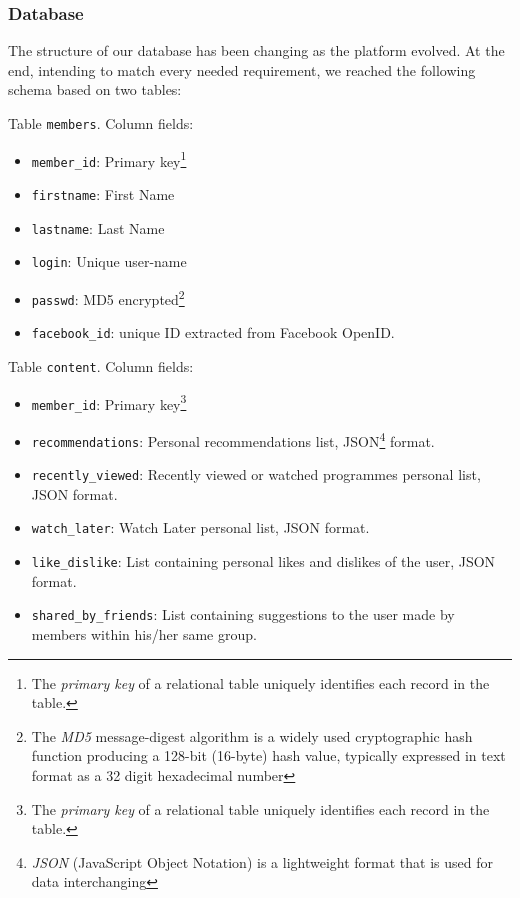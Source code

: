 \documentclass{acm_proc_article-sp}
\begin{document}
\subsubsection{Database}

The structure of our database has been changing as the platform evolved. At the end, intending to match every needed requirement, we reached the following schema based on two tables:

Table \texttt{members}. Column fields:

\begin{itemize}
\item \texttt{member\_id}: Primary key\footnote{The \textit{primary key} of a relational table uniquely identifies each record in the table.}
\item \texttt{firstname}: First Name
\item \texttt{lastname}: Last Name
\item \texttt{login}: Unique user-name
\item \texttt{passwd}: MD5 encrypted\footnote{The \textit{MD5} message-digest algorithm is a widely used cryptographic hash function producing a 128-bit (16-byte) hash value, typically expressed in text format as a 32 digit hexadecimal number}
\item \texttt{facebook\_id}: unique ID extracted from Facebook OpenID.
\end{itemize}

Table \texttt{content}. Column fields:

\begin{itemize}
\item \texttt{member\_id}: Primary key\footnote{The \textit{primary key} of a relational table uniquely identifies each record in the table.}
\item \texttt{recommendations}: Personal recommendations list, JSON\footnote{\textit{JSON} (JavaScript Object Notation) is a lightweight format that is used for data interchanging} format.
\item \texttt{recently\_viewed}: Recently viewed or watched programmes personal list, JSON format.
\item \texttt{watch\_later}: Watch Later personal list, JSON format.
\item \texttt{like\_dislike}: List containing personal likes and dislikes of the user, JSON format.
\item \texttt{shared\_by\_friends}: List containing suggestions to the user made by members within his/her same group. 
\end{itemize}
\end{document}
